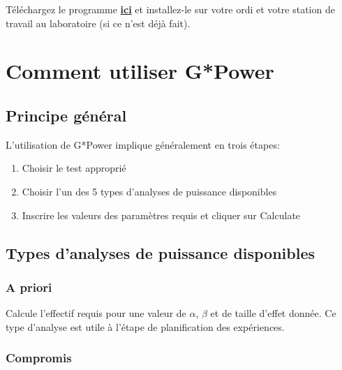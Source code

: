 \documentclass[
  12pt,
]{book}
\makeatletter
\providecommand{\tightlist}{%
  \setlength{\itemsep}{0pt}\setlength{\parskip}{0pt}}
\newenvironment{kframe}{%
\medskip{}
\setlength{\fboxsep}{.8em}
\def\at@end@of@kframe{}%
\ifinner\ifhmode%
 \def\at@end@of@kframe{\end{minipage}}%
 \begin{minipage}{\columnwidth}%
\fi\fi%
\def\FrameCommand##1{\hskip\@totalleftmargin \hskip-\fboxsep
\colorbox{incolor}{##1}\hskip-\fboxsep
    \hskip-\linewidth \hskip-\@totalleftmargin \hskip\columnwidth}%
\MakeFramed {\advance\hsize-\width
  \@totalleftmargin\z@ \linewidth\hsize
  \@setminipage}}%
{\par\unskip\endMakeFramed%
\at@end@of@kframe}
\newenvironment{rmdblock}[1]
 {
 \begin{itemize}
 \renewcommand{\labelitemi}{
   \raisebox{-.7\height}[0pt][0pt]{
     {\setkeys{Gin}{width=3em,keepaspectratio}\texttt{[image: images/\#1]}}
   }
 }
 \begin{kframe}
 \setlength{\fboxsep}{1em}
 \item
 }
 {
 \end{kframe}
 \end{itemize}
 }
\newenvironment{rmdcode}
  {\begin{rmdblock}{screen}}
  {\end{rmdblock}}
\makeatother
\begin{document}
\begin{rmdcode}
Téléchargez le programme \textbf{\href{https://www.psychologie.hhu.de/arbeitsgruppen/allgemeine-psychologie-und-arbeitspsychologie/gpower.html}{ici}} et installez-le sur votre ordi et votre station de travail au laboratoire (si ce n'est déjà fait).
\end{rmdcode}

\hypertarget{comment-utiliser-gpower}{%
\section{Comment utiliser G*Power}\label{comment-utiliser-gpower}}

\hypertarget{principe-guxe9nuxe9ral}{%
\subsection{Principe général}\label{principe-guxe9nuxe9ral}}

L'utilisation de G*Power implique généralement en trois étapes:

\begin{enumerate}
\def\labelenumi{\arabic{enumi}.}
\tightlist
\item
  Choisir le test approprié
\item
  Choisir l'un des 5 types d'analyses de puissance disponibles
\item
  Inscrire les valeurs des paramètres requis et cliquer sur Calculate
\end{enumerate}

\hypertarget{types-danalyses-de-puissance-disponibles}{%
\subsection{Types d'analyses de puissance disponibles}\label{types-danalyses-de-puissance-disponibles}}

\hypertarget{a-priori}{%
\subsubsection*{A priori}\label{a-priori}}

Calcule l'effectif requis pour une valeur de \(\alpha\), \(\beta\) et de taille d'effet donnée.
Ce type d'analyse est utile à l'étape de planification des expériences.

\hypertarget{compromis}{%
\subsubsection*{Compromis}\label{compromis}}
\end{document}
